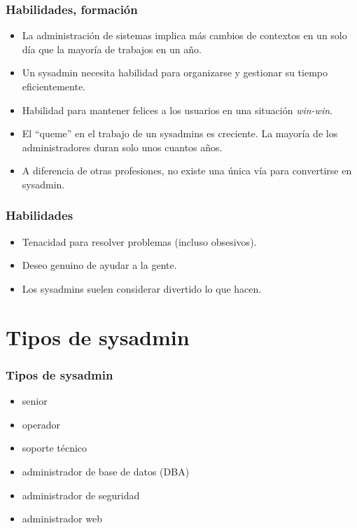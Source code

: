 \documentclass{beamer}
\begin{document}

\begin{frame}
\frametitle{Habilidades, formación}

\begin{itemize}
\item La administración de sistemas implica más cambios de contextos en un solo día que la mayoría de trabajos en un año.

\item Un sysadmin necesita habilidad para organizarse y gestionar su tiempo eficientemente.
\item Habilidad para mantener felices a los usuarios en una situación \textit{win-win}.
\item El ``queme'' en el trabajo de un sysadmins es creciente. La mayoría de los administradores duran solo unos cuantos años.
\item A diferencia de otras profesiones, no existe una única vía para convertirse en sysadmin.
\end{itemize}
\end{frame}


\begin{frame}
\frametitle{Habilidades}

\begin{itemize}
\item Tenacidad para resolver problemas (incluso obsesivos).
\item Deseo genuino de ayudar a la gente.
\item Los sysadmins suelen considerar divertido lo que hacen.
\end{itemize}
\end{frame}


\section{Tipos de sysadmin}


\begin{frame}
\frametitle{Tipos de sysadmin}

\begin{itemize}
\item senior
\item operador
\item soporte técnico 
\item administrador de base de datos (DBA)
\item administrador de seguridad
\item administrador web
\end{itemize}
\end{frame}
\end{document}
